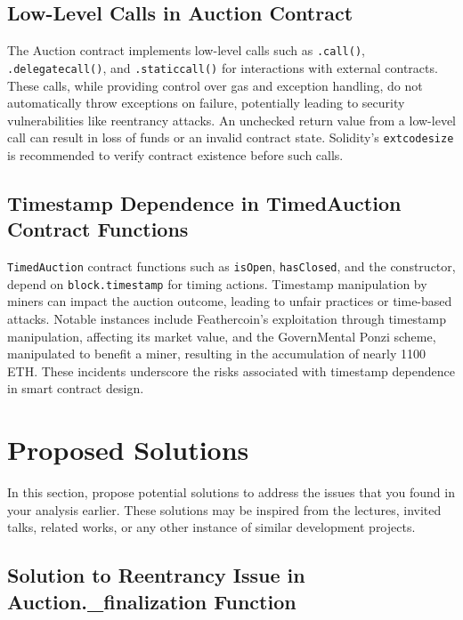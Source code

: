 \documentclass[conference]{IEEEtran}
\begin{document}
\subsection{Low-Level Calls in Auction Contract}
The Auction contract implements low-level calls such as \texttt{.call()}, \texttt{.delegatecall()}, and \texttt{.staticcall()} for interactions with external contracts. These calls, while providing control over gas and exception handling, do not automatically throw exceptions on failure, potentially leading to security vulnerabilities like reentrancy attacks. An unchecked return value from a low-level call can result in loss of funds or an invalid contract state. Solidity's \texttt{extcodesize} is recommended to verify contract existence before such calls\cite{zipfel2023lowlevelcall}.


\subsection{Timestamp Dependence in TimedAuction Contract Functions}
\texttt{TimedAuction} contract functions such as \texttt{isOpen}, \texttt{hasClosed}, and the constructor, depend on \texttt{block.timestamp} for timing actions. Timestamp manipulation by miners can impact the auction outcome, leading to unfair practices or time-based attacks. Notable instances include Feathercoin's exploitation through timestamp manipulation, affecting its market value, and the GovernMental Ponzi scheme, manipulated to benefit a miner, resulting in the accumulation of nearly 1100 ETH. These incidents underscore the risks associated with timestamp dependence in smart contract design\cite{neptunemutual2023timestamp}.



\section{Proposed Solutions}
In this section, propose potential solutions to address the issues that you found in your analysis earlier. These solutions may be inspired from the lectures, invited talks, related works, or any other instance of similar development projects. 

\subsection{Solution to Reentrancy Issue in Auction.\_finalization Function}
\end{document}

